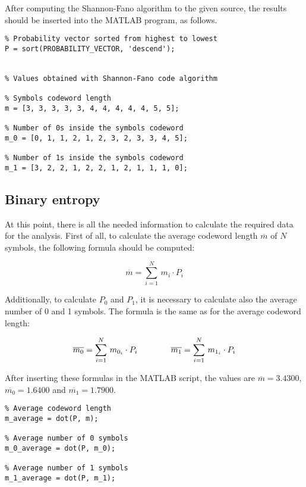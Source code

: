 \FloatBarrier \noindent After computing the Shannon-Fano algorithm to the given source, the results should be inserted into the MATLAB program, as follows.

\begin{lstlisting}
% Probability vector sorted from highest to lowest
P = sort(PROBABILITY_VECTOR, 'descend');


% Values obtained with Shannon-Fano code algorithm

% Symbols codeword length
m = [3, 3, 3, 3, 3, 4, 4, 4, 4, 4, 5, 5]; 

% Number of 0s inside the symbols codeword
m_0 = [0, 1, 1, 2, 1, 2, 3, 2, 3, 3, 4, 5];

% Number of 1s inside the symbols codeword
m_1 = [3, 2, 2, 1, 2, 2, 1, 2, 1, 1, 1, 0];
\end{lstlisting}


\subsection{Binary entropy}
At this point, there is all the needed information to calculate the required data for the analysis. First of all, to calculate the average codeword length $\overline{m}$ of $N$ symbols, the following formula should be computed:

\begin{equation*}
    \overline{m} = \sum_{i = 1}^N\,m_i \cdot P_i 
\end{equation*}

\noindent Additionally, to calculate $P_0$ and $P_1$, it is necessary to calculate also the average number of 0 and 1 symbols. The formula is the same as for the average codeword length:

\begin{equation*}
    \overline{m_0} = \sum_{i = 1}^N\,m_{0_i} \cdot P_i 
    \hspace*{40px}
    \overline{m_1} = \sum_{i = 1}^N\,m_{1_i} \cdot P_i
\end{equation*}

\noindent After inserting these formulas in the MATLAB script, the values are $\overline{m} = 3.4300$, $\overline{m_0} = 1.6400$ and $\overline{m_1} = 1.7900$.

\begin{lstlisting}
% Average codeword length
m_average = dot(P, m); 

% Average number of 0 symbols
m_0_average = dot(P, m_0);

% Average number of 1 symbols
m_1_average = dot(P, m_1);
\end{lstlisting}


